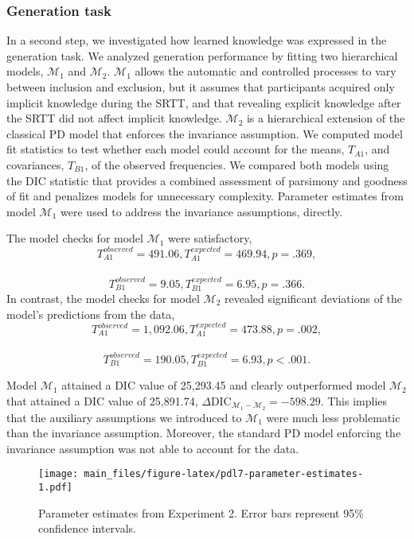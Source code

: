\documentclass[man]{apa6}
\theoremstyle{definition}
\theoremstyle{definition}
\theoremstyle{definition}
\theoremstyle{remark}
\begin{document}
\subsubsection{Generation task}\label{generation-task-1}

In a second step, we investigated how learned knowledge was expressed in
the generation task. We analyzed generation performance by fitting two
hierarchical models, \(\mathcal{M}_1\) and \(\mathcal{M}_2\).
\(\mathcal{M}_1\) allows the automatic and controlled processes to vary
between inclusion and exclusion, but it assumes that participants
acquired only implicit knowledge during the SRTT, and that revealing
explicit knowledge after the SRTT did not affect implicit knowledge.
\(\mathcal{M}_2\) is a hierarchical extension of the classical PD model
that enforces the invariance assumption. We computed model fit
statistics to test whether each model could account for the means,
\(T_{A1}\), and covariances, \(T_{B1}\), of the observed frequencies. We
compared both models using the DIC statistic that provides a combined
assessment of parsimony and goodness of fit and penalizes models for
unnecessary complexity. Parameter estimates from model \(\mathcal{M}_1\)
were used to address the invariance assumptions, directly.

The model checks for model \(\mathcal{M}_1\) were satisfactory,
\[T_{A1}^{observed} = 491.06, T_{A1}^{expected} = 469.94, p = .369,\]~
\[T_{B1}^{observed} = 9.05, T_{B1}^{expected} = 6.95, p = .366.\] In
contrast, the model checks for model \(\mathcal{M}_2\) revealed
significant deviations of the model's predictions from the data,
\[T_{A1}^{observed} = 1,092.06, T_{A1}^{expected} = 473.88, p = .002,\]~
\[T_{B1}^{observed} = 190.05, T_{B1}^{expected} = 6.93, p < .001.\]

Model \(\mathcal{M}_1\) attained a DIC value of 25,293.45 and clearly
outperformed model \(\mathcal{M}_2\) that attained a DIC value of
25,891.74,
\(\Delta \textrm{DIC}_{\mathcal{M}_1 - \mathcal{M}_2} = -598.29\). This
implies that the auxiliary assumptions we introduced to
\(\mathcal{M}_1\) were much less problematic than the invariance
assumption. Moreover, the standard PD model enforcing the invariance
assumption was not able to account for the data.

\begin{figure}
\centering
\texttt{[image: main\_files/figure-latex/pdl7-parameter-estimates-1.pdf]}
\caption{\label{fig:pdl7-parameter-estimates}Parameter estimates from
Experiment 2. Error bars represent 95\% confidence intervals.}
\end{figure}
\end{document}

